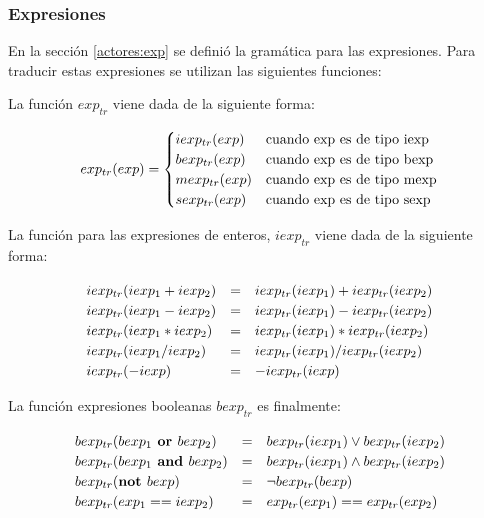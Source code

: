 \subsubsection*{Expresiones}

En la sección \ref{actores:exp} se definió la gramática para las expresiones. Para traducir estas expresiones se utilizan las siguientes funciones:

La función $exp_{tr}$ viene dada de la siguiente forma:

\begin{equation*}
  exp_{tr}(exp) =
  \setlength{\arraycolsep}{0pt}
  \renewcommand{\arraystretch}{1.2}
  \left\{\begin{array}{l @{\quad} l}
        iexp_{tr}(exp)    & \text{cuando exp es de tipo iexp} \\
        bexp_{tr}(exp)    & \text{cuando exp es de tipo bexp} \\
        mexp_{tr}(exp)    & \text{cuando exp es de tipo mexp} \\
        sexp_{tr}(exp)    & \text{cuando exp es de tipo sexp} \\
  \end{array}\right.
\end{equation*}

La función para las expresiones de enteros, $iexp_{tr}$ viene dada de la siguiente forma:

\begin{equation*}
\begin{array}{l c l}
iexp_{tr}(iexp_1 + iexp_2) &=& iexp_{tr}(iexp_1) + iexp_{tr}(iexp_2) \\
iexp_{tr}(iexp_1 - iexp_2) &=& iexp_{tr}(iexp_1) - iexp_{tr}(iexp_2) \\
iexp_{tr}(iexp_1 * iexp_2) &=& iexp_{tr}(iexp_1) * iexp_{tr}(iexp_2) \\ 
iexp_{tr}(iexp_1 / iexp_2) &=& iexp_{tr}(iexp_1) / iexp_{tr}(iexp_2) \\
iexp_{tr}(- iexp) &=& - iexp_{tr}(iexp)
\end{array}
\end{equation*}

La función expresiones booleanas $bexp_{tr}$ es finalmente:

\begin{equation*}
\begin{array}{l c l}
bexp_{tr}(bexp_1 \textbf{ or } bexp_2) &=& bexp_{tr}(iexp_1) \vee bexp_{tr}(iexp_2) \\
bexp_{tr}(bexp_1 \textbf{ and } bexp_2) &=& bexp_{tr}(iexp_1) \wedge bexp_{tr}(iexp_2) \\
bexp_{tr}(\textbf{not } bexp) &=& \neg bexp_{tr}(bexp) \\ 
bexp_{tr}(exp_1 == iexp_2) &=& exp_{tr}(exp_1) == exp_{tr}(exp_2) \\
\end{array}
\end{equation*}

